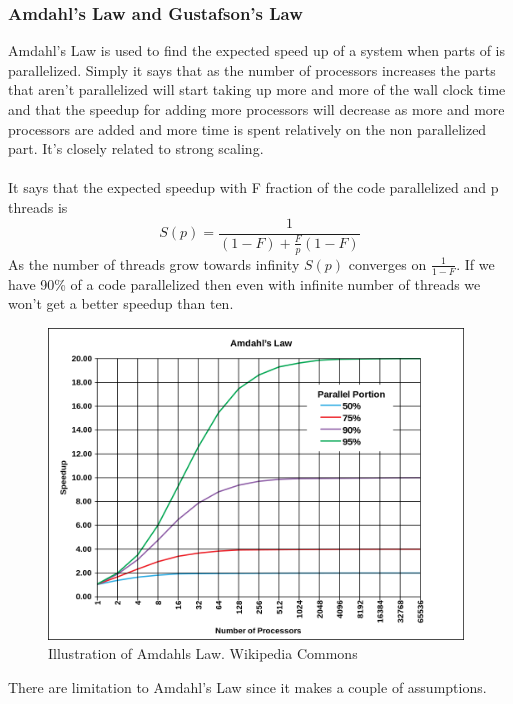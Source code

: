 \documentclass[10pt,a4paper]{report}
\begin{document}
\subsubsection{Amdahl's Law and Gustafson's Law}
Amdahl's Law is used to find the expected speed up of a system when parts of is parallelized. Simply it says that as the number of processors increases the parts that aren't parallelized will start taking up more and more of the wall clock time and that the speedup for adding more processors will decrease as more and more processors are added and more time is spent relatively on the non parallelized part. It's closely related to strong scaling.\cite{cuda_best_practice,2010_reevaluating_amdahl}\\
\\
It says that the expected speedup with F fraction of the code parallelized and p threads is 
$$S(p)=\frac{1}{(1-F)+\frac{F}{p}(1-F)}$$
As the number of threads grow towards infinity $S(p)$ converges on $\frac{1}{1-F}$. If we have 90\% of a code parallelized then even with infinite number of threads we won't get a better speedup than ten.\cite{2010_reevaluating_amdahl}

\begin{figure}[h]
    \centering
    \includegraphics[width=11cm]{AmdahlsLaw.png}
    \caption{Illustration of Amdahls Law. Wikipedia Commons}
    \label{fig:AmdahlsLaw}
\end{figure}

There are limitation to Amdahl's Law since it makes a couple of assumptions.
\end{document}
